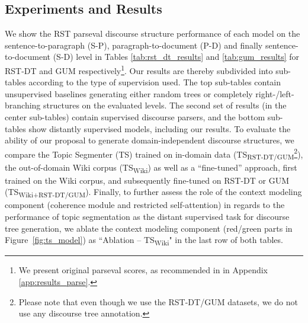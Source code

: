 \documentclass[letterpaper]{article} %
\begin{document}
\subsection{Experiments and Results}
\label{results}
We show the RST parseval discourse structure performance of each model on the sentence-to-paragraph (S-P), paragraph-to-document (P-D) and finally sentence-to-document (S-D) level in Tables \ref{tab:rst_dt_results} and \ref{tab:gum_results} for RST-DT and GUM respectively\footnote{We present original parseval scores, as recommended in \citet{morey-etal-2017-much} in Appendix \ref{app:results_parse}.}. Our results are thereby subdivided into sub-tables according to the type of supervision used. The top sub-tables contain unsupervised baselines generating either random trees or completely right-/left-branching structures on the evaluated levels. The second set of results (in the center sub-tables) contain supervised discourse parsers, and the bottom sub-tables show distantly supervised models, including our results. To evaluate the ability of our proposal to generate domain-independent discourse structures, we compare the Topic Segmenter (TS) trained on in-domain data (TS\textsubscript{RST-DT/GUM}\footnote{Please note that even though we use the RST-DT/GUM datasets, we do not use any discourse tree annotation.}), the out-of-domain Wiki corpus (TS\textsubscript{Wiki}) as well as a ``fine-tuned'' approach, first trained on the Wiki corpus, and subsequently fine-tuned on RST-DT or GUM (TS\textsubscript{Wiki+RST-DT/GUM}).
Finally, to further assess the role of the context modeling component (coherence module and restricted self-attention) in regards to the performance of topic segmentation as the distant supervised task for discourse tree generation, we ablate the context modeling component (red/green parts in Figure~\ref{fig:ts_model}) as ``Ablation -- TS\textsubscript{Wiki}" in the last row of both tables.
\end{document}
